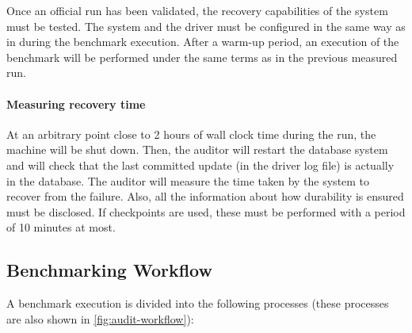 Once an official run has been validated, the recovery capabilities of the system must be tested. The system and the driver must be configured in the same way as in during the benchmark execution. After a warm-up period, an execution of the benchmark will be performed under the same terms as in the previous measured run.

\paragraph{Measuring recovery time}
At an arbitrary point close to 2 hours of wall clock time during the run, the machine will be shut down. Then, the auditor will restart the database system and will check that the last committed update (in the driver log file) is actually in the database. The auditor will measure the time taken by the system to recover from the failure. Also, all the information about how durability is ensured must be disclosed. If checkpoints are used, these must be performed with a period of 10 minutes at most.


\subsection{Benchmarking Workflow}
\label{sec:int-benchmark-workflow}

A benchmark execution is divided into the following processes (these processes are also shown in \autoref{fig:audit-workflow}):

